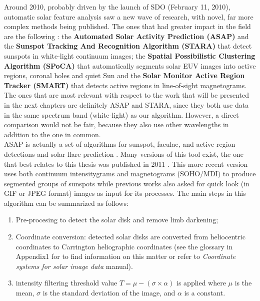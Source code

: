 Around 2010, probably driven by the launch of SDO (February 11, 2010), automatic solar feature analysis saw a new wave of research, with novel, far more complex methods being published. The ones that had greater impact in the field are the following \cite{verbeeck2013multi}: the \textbf{Automated Solar Activity Prediction (ASAP)} and the \textbf{Sunspot Tracking And Recognition Algorithm (STARA)} \cite{watson2009modelling} that detect sunspots in white-light continuum images; the \textbf{Spatial Possibilistic Clustering Algorithm (SPoCA)}  \cite{barra2009fast} that automatically segments solar EUV images into active regions, coronal holes and quiet Sun  and the \textbf{Solar Monitor Active Region Tracker (SMART)} \cite{higgins2011solar} that detects active regions in line-of-sight magnetograms. The ones that are most relevant with respect to the work that will be presented in the next chapters are definitely ASAP and STARA, since they both use data in the same spectrum band (white-light) as our algorithm. However, a direct comparison would not be fair, because they also use other wavelengths in addition to the one in common.\\
ASAP is actually a set of algorithms for sunspot, faculae, and active-region detections \cite{colak2008automated} and solar-flare prediction \cite{colak2009automated}. Many versions of this tool exist, the one that best relates to this thesis  was published in 2011 \cite{colak2011representation}. This more recent version uses both continuum intensitygrams and magnetograms (SOHO/MDI) to produce segmented groups of sunspots while previous works also asked for quick look (in GIF or JPEG format) images as input for its processes. The main steps in this algorithm can be summarized as follows:
\begin{enumerate}
  \item Pre-procesing to detect the solar disk and remove limb darkening;
  \item Coordinate conversion: detected solar disks are converted from heliocentric coordinates to Carrington heliographic coordinates (see the glossary in Appendix1 for to find information on this matter or refer to \textit{Coordinate systems for solar image data} \cite{thompson2006coordinate} manual).
  \item intensity filtering threshold value $T = \mu - (\sigma \times \alpha)$ is applied where $\mu$ is the mean, $\sigma$ is the standard deviation of the image, and $\alpha$ is a constant.
\end{enumerate}
